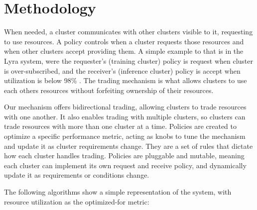 \section{Methodology}
\vspace{1em}

\vspace{1em}
When needed, a cluster communicates with other clusters visible to it, requesting to use resources. A policy 
controls when a cluster requests those resources and when other clusters accept providing them. 
A simple example to that is in the Lyra system, were the requester's (training cluster) policy is request 
when cluster is over-subscribed, and the receiver's (inference cluster) policy is accept when 
utilization is below 98\% \cite{li_lyra_2023}. The trading mechanism is what allows clusters to use each others 
resources without forfeiting ownership of their resources. 

Our mechanism offers bidirectional trading, allowing clusters to trade resources with one another. It also 
enables trading with multiple clusters, so clusters can trade resources with more than one cluster at a time. \label{sched-overhead} 
Policies are created to optimize a specific performance metric, acting as knobs to 
tune the mechanism and update it as cluster requirements change. They are a set of rules that dictate how each 
cluster handles trading. Policies are pluggable and mutable, meaning each cluster can implement its own request and receive 
policy, and dynamically update it as requirements or conditions change.

The following algorithms show a simple representation of the system, with resource utilization as the 
optimized-for metric: \label{example}

